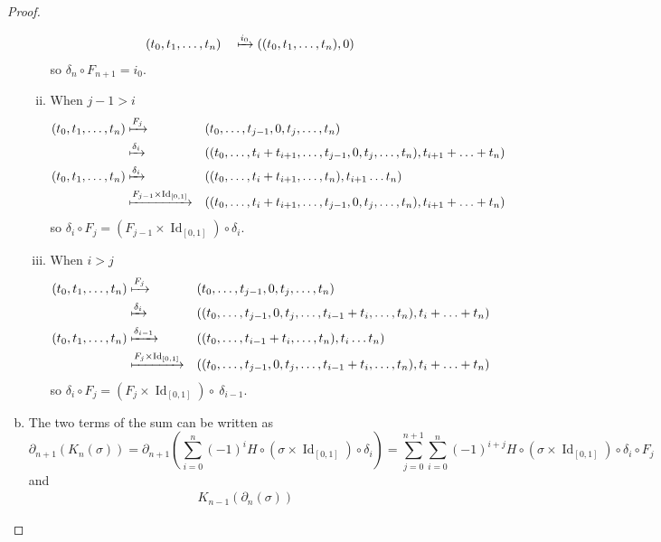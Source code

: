 \documentclass{article}
\newcommand{\id}[1]{\operatorname{Id}_{#1}}
\begin{document}
\begin{proof}
\begin{enumerate}[a.]
\begin{enumerate}[(i)]
\begin{alignat*}{2}
        (t_0, t_1, \hdots, t_n) &
        &&\xmapsto{i_0} ((t_0, t_1, \hdots, t_n), 0)
      \end{alignat*}
      so $\delta_n \circ F_{n+1} = i_0$.
      \item
      When $j - 1 > i$ \begin{alignat*}{2}
        (t_0, t_1, \hdots, t_n)
        &\xmapsto{F_j} &&(t_0, \hdots, t_{j-1}, 0, t_j, \hdots, t_n) \\
        &\xmapsto{\delta_i} && (
          (t_0, \hdots, t_i + t_{i + 1}, \hdots, t_{j-1}, 0, t_j, \hdots, t_n),
          t_{i+1} + \hdots + t_n
        ) \\
        (t_0, t_1, \hdots, t_n)
        &\xmapsto{\delta_i} &&
        ((t_0, \hdots, t_i + t_{i + 1}, \hdots, t_n), t_{i + 1} \hdots t_n)\\
        &\xmapsto{F_{j-1} \times \id{[0,1]}} &&(
          (t_0, \hdots, t_i + t_{i + 1}, \hdots, t_{j-1}, 0, t_j, \hdots, t_n),
          t_{i+1} + \hdots + t_n
        )
      \end{alignat*}
      so $\delta_i \circ F_j = (F_{j-1} \times \id{[0,1]}) \circ \delta_i$.
      \item
      When $i > j$ \begin{alignat*}{2}
        (t_0, t_1, \hdots, t_n)
        &\xmapsto{F_j} &&(t_0, \hdots, t_{j-1}, 0, t_j, \hdots, t_n) \\
        &\xmapsto{\delta_i} && (
          (t_0, \hdots, t_{j-1}, 0, t_j, \hdots, t_{i-1} + t_i, \hdots, t_n),
          t_i + \hdots + t_n
        ) \\
        (t_0, t_1, \hdots, t_n)
        &\xmapsto{\delta_{i-1}} &&
        ((t_0, \hdots, t_{i-1} + t_i, \hdots, t_n), t_i \hdots t_n)\\
        &\xmapsto{F_j \times \id{[0,1]}} &&(
          (t_0, \hdots, t_{j-1}, 0, t_j, \hdots, t_{i-1} + t_i, \hdots, t_n),
          t_i + \hdots + t_n
        )
      \end{alignat*}
      so $\delta_i \circ F_j = (F_j \times \id{[0,1]}) \circ ~ \delta_{i-1}$.
    \end{enumerate}
    \item The two terms of the sum can be written as \[
      \partial_{n+1}(K_n(\sigma))
      = \partial_{n+1} \left(\sum_{i=0}^{n} (-1)^{i} H\circ(\sigma \times \id{[0,1]}) \circ \delta_i\right)
      = \sum_{j=0}^{n+1}\sum_{i=0}^{n} (-1)^{i + j} H\circ(\sigma \times \id{[0,1]}) \circ \delta_i \circ F_j
    \] and \begin{align}
      K_{n-1}(\partial_{n}(\sigma))

\end{align}
\end{enumerate}
\end{proof}
\end{document}
